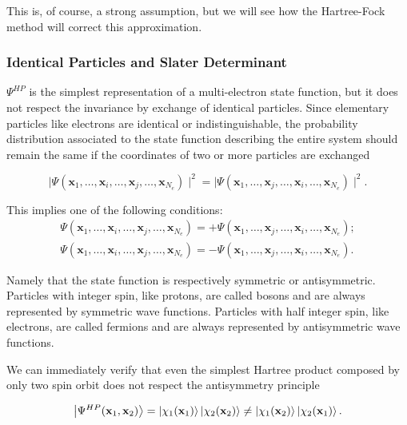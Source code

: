 \documentclass[a4paper,12pt]{article}
\begin{document}
This is, of course, a strong assumption, but we will see how the Hartree-Fock method will correct this approximation.



\subsubsection{Identical Particles and Slater Determinant}

$\Psi^{HP}$ is the simplest representation of a multi-electron state function, but it does not respect the invariance by exchange of identical particles.
Since elementary particles like electrons are identical or indistinguishable, the probability distribution associated to the state function describing the entire system should remain the same if the coordinates of two or more particles are exchanged

\begin{equation}
	\mid \Psi(\mathbf{x}_1,\dots,\mathbf{x}_i,\dots,\mathbf{x}_j,\dots,\mathbf{x}_{N_e}) \mid^2 = \mid \Psi(\mathbf{x}_1,\dots,\mathbf{x}_j,\dots,\mathbf{x}_i,\dots,\mathbf{x}_{N_e}) \mid^2.
\end{equation}

This implies one of the following conditions:
\begin{align}
	\Psi(\mathbf{x}_1,\dots,\mathbf{x}_i,\dots,\mathbf{x}_j,\dots,\mathbf{x}_{N_e}) = 
		+\Psi(\mathbf{x}_1,\dots,\mathbf{x}_j,\dots,\mathbf{x}_i,\dots,\mathbf{x}_{N_e});\\
	\Psi(\mathbf{x}_1,\dots,\mathbf{x}_i,\dots,\mathbf{x}_j,\dots,\mathbf{x}_{N_e}) = 
		-\Psi(\mathbf{x}_1,\dots,\mathbf{x}_j,\dots,\mathbf{x}_i,\dots,\mathbf{x}_{N_e}).
\end{align}

Namely that the state function is respectively symmetric or antisymmetric.
Particles with integer spin, like protons, are called bosons and are always represented by symmetric wave functions.
Particles with half integer spin, like electrons, are called fermions and are always represented by antisymmetric wave functions.

We can immediately verify that even the simplest Hartree product composed by only two spin orbit does not respect the antisymmetry principle

\begin{equation*}
	\ket{\Psi^{HP}(\mathbf{x}_1,\mathbf{x}_2)} = \ket{\chi_1(\mathbf{x}_1)} \ket{\chi_2(\mathbf{x}_2)} \neq \ket{\chi_1(\mathbf{x}_2)} \ket{\chi_2(\mathbf{x}_1)}.
\end{equation*}
\end{document}
